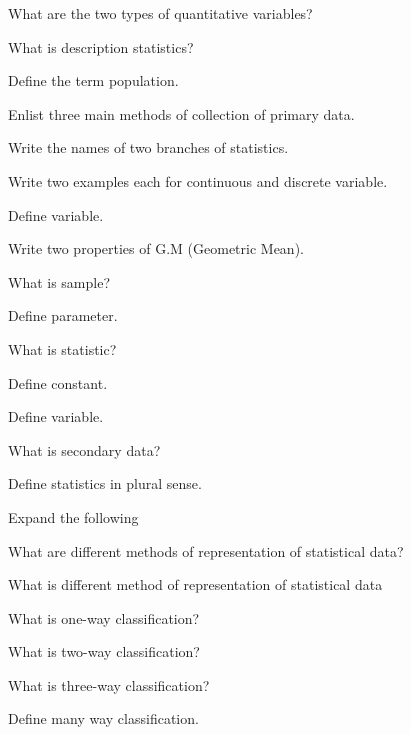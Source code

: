\documentclass[11pt,a4paper]{article}
\begin{document}
\begin{shortlist}
\item What are the two types of quantitative variables?

\item What is description statistics?

\item Define the term population.

\item Enlist three main methods of collection of primary data.

\item Write the names of two branches of statistics.

\item Write two examples each for continuous and discrete variable.

\item Define variable.

\item Write two properties of G.M (Geometric Mean).

\item What is sample?

\item Define parameter.

\item What is statistic?

\item Define constant.

\item Define variable.

\item What is secondary data?

\item Define statistics in plural sense.

\item Expand the following

\item What are different methods of representation of statistical data?

\item What is different method of representation of statistical data

\item What is one-way classification?

\item What is two-way classification?

\item What is three-way classification?

\item Define many way classification.


\end{shortlist}
\end{document}
